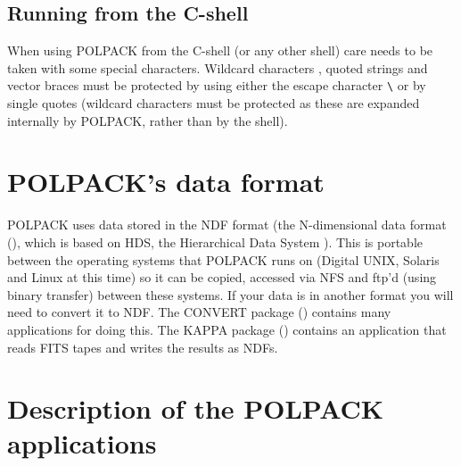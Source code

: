 \subsection{Running from the C-shell}
When using POLPACK from the C-shell (or any other shell) care needs to be
taken with some special characters. Wildcard characters ,
quoted strings  and vector braces \text{[ ]} must be protected
by using either the escape character {\small \verb+\+} or by single
quotes (wildcard characters must be protected as these are expanded
internally by POLPACK, rather than by the shell).

\section{POLPACK's data format}
POLPACK uses data stored in the NDF format (the N-dimensional data
format (), which is based on HDS,
the Hierarchical Data System ).
This is portable between the operating
systems that POLPACK runs on (Digital UNIX, Solaris and Linux at this time)
so it can be copied, accessed via NFS and ftp'd (using binary
transfer) between these systems. If your data is in another format you
will need to convert it to NDF. The CONVERT package
() contains many applications for doing this. The
KAPPA package () contains an application
 that reads FITS tapes and writes the
results as NDFs.

\newpage
\appendix
\section{Description of the POLPACK applications \label{app:description}}
\begin{latexonly}
%
%








\end{latexonly}

